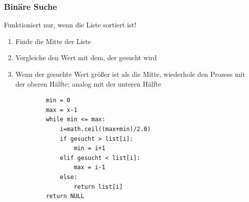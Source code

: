 \documentclass{beamer}
\begin{document}
	\begin{frame}[fragile]
		\frametitle{Binäre Suche}
		Funktioniert nur, wenn die Liste sortiert ist!\\
		\begin{enumerate}
			\item Finde die Mitte der Liste
			\item Vergleiche den Wert mit dem, der gesucht wird
			\item Wenn der gesuchte Wert größer ist als die Mitte, wiederhole den Prozess mit der oberen Hälfte; analog mit der unteren Hälfte\\\pause
		\end{enumerate}
		\begin{lstlisting}
			min = 0
			max = x-1
			while min <= max:
				i=math.ceil((max+min)/2.0)
				if gesucht > list[i]:
					min = i+1
				elif gesucht < list[i]:
					max = i-1
				else:
					return list[i]
			return NULL
		\end{lstlisting}
	\end{frame}
\end{document}
